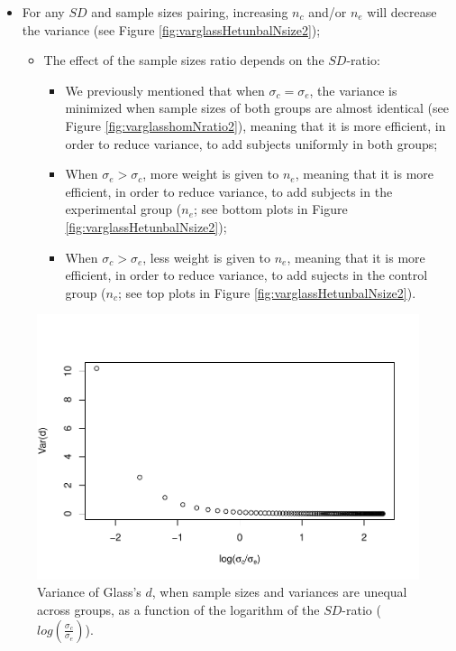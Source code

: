 \documentclass[
  english,
  man,mask]{apa6}
\providecommand{\tightlist}{%
  \setlength{\itemsep}{0pt}\setlength{\parskip}{0pt}}
\begin{document}
\begin{itemize}
\item
  For any \(SD\) and sample sizes pairing, increasing \(n_c\) and/or \(n_e\) will decrease the variance (see Figure \ref{fig:varglassHetunbalNsize2});

  \begin{itemize}
  \tightlist
  \item
    The effect of the sample sizes ratio depends on the \(SD\)-ratio:

    \begin{itemize}
    \tightlist
    \item
      We previously mentioned that when \(\sigma_c=\sigma_e\), the variance is minimized when sample sizes of both groups are almost identical (see Figure \ref{fig:varglasshomNratio2}), meaning that it is more efficient, in order to reduce variance, to add subjects uniformly in both groups;\\
    \item
      When \(\sigma_e > \sigma_c\), more weight is given to \(n_e\), meaning that it is more efficient, in order to reduce variance, to add subjects in the experimental group (\(n_e\); see bottom plots in Figure \ref{fig:varglassHetunbalNsize2});\\
    \item
      When \(\sigma_c > \sigma_e\), less weight is given to \(n_e\), meaning that it is more efficient, in order to reduce variance, to add sujects in the control group (\(n_c\); see top plots in Figure \ref{fig:varglassHetunbalNsize2}).
    \end{itemize}
  \end{itemize}
\end{itemize}

\begin{figure}
\centering
\includegraphics{Theoretical-Bias-of-all-estimators-as-a-function-of-population-parameters_files/figure-latex/varglasshetunbalSDratio2-1.pdf}
\caption{\label{fig:varglasshetunbalSDratio2}Variance of Glass's \(d\), when sample sizes and variances are unequal across groups, as a function of the logarithm of the \(SD\)-ratio (\(log \left( \frac{\sigma_c}{\sigma_e} \right)\)).}
\end{figure}
\end{document}
